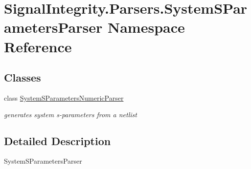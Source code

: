 \hypertarget{namespaceSignalIntegrity_1_1Parsers_1_1SystemSParametersParser}{}\section{Signal\+Integrity.\+Parsers.\+System\+S\+Parameters\+Parser Namespace Reference}
\label{namespaceSignalIntegrity_1_1Parsers_1_1SystemSParametersParser}
\subsection*{Classes}
\begin{DoxyCompactItemize}
\item 
class \hyperlink{classSignalIntegrity_1_1Parsers_1_1SystemSParametersParser_1_1SystemSParametersNumericParser}{System\+S\+Parameters\+Numeric\+Parser}
\begin{DoxyCompactList}\small\item\em generates system s-\/parameters from a netlist \end{DoxyCompactList}\end{DoxyCompactItemize}


\subsection{Detailed Description}
\begin{DoxyVerb}SystemSParametersParser\end{DoxyVerb}
 